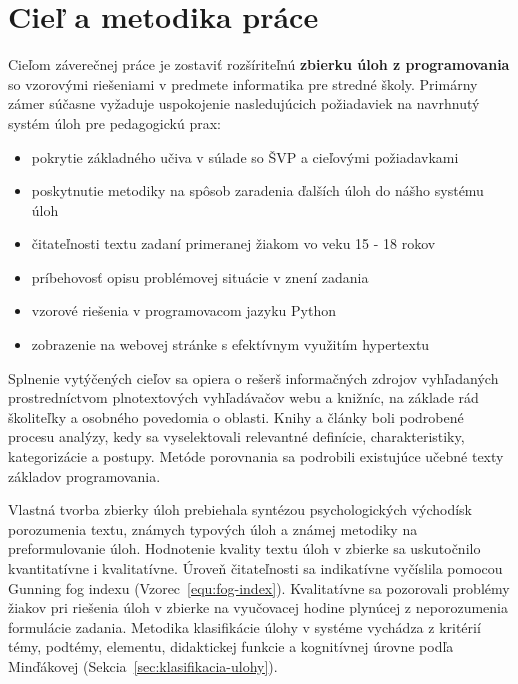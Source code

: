 \chapter{Cieľ a metodika práce}
Cieľom záverečnej práce je zostaviť rozšíriteľnú \textbf{zbierku úloh z programovania} so vzorovými riešeniami v predmete informatika pre stredné školy. Primárny zámer súčasne vyžaduje uspokojenie nasledujúcich požiadaviek na navrhnutý systém úloh pre pedagogickú prax:

\begin{itemize}[noitemsep]
\item pokrytie základného učiva v súlade so ŠVP a cieľovými požiadavkami
\item poskytnutie metodiky na spôsob zaradenia ďalších úloh do nášho systému úloh
\item čitateľnosti textu zadaní primeranej žiakom vo veku 15 - 18 rokov
\item príbehovosť opisu problémovej situácie v znení zadania
\item vzorové riešenia v programovacom jazyku Python
\item zobrazenie na webovej stránke s efektívnym využitím hypertextu
\end{itemize}

Splnenie vytýčených cieľov sa opiera o rešerš informačných zdrojov vyhľadaných prostredníctvom plnotextových vyhľadávačov webu a knižníc, na základe rád školiteľky a osobného povedomia o oblasti. Knihy a články boli podrobené procesu analýzy, kedy sa vyselektovali relevantné definície, charakteristiky, kategorizácie a postupy. Metóde porovnania sa podrobili existujúce učebné texty základov programovania.

Vlastná tvorba zbierky úloh prebiehala syntézou psychologických východísk porozumenia textu, známych typových úloh a známej metodiky na preformulovanie úloh. Hodnotenie kvality textu úloh v zbierke sa uskutočnilo kvantitatívne i kvalitatívne. Úroveň čitateľnosti sa indikatívne vyčíslila pomocou Gunning fog indexu (Vzorec~\ref{equ:fog-index}). Kvalitatívne sa pozorovali problémy  žiakov pri riešenia úloh v zbierke na vyučovacej hodine plynúcej z neporozumenia formulácie zadania. Metodika klasifikácie úlohy v systéme vychádza z kritérií témy, podtémy, elementu, didaktickej funkcie a kognitívnej úrovne podľa Minďákovej (Sekcia~\ref{sec:klasifikacia-ulohy}).
